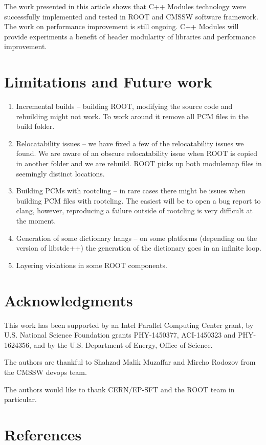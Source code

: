 \documentclass[12pt]{iopart}
\begin{document}
 The work presented in this article shows that C++ Modules technology were successfully implemented and tested in ROOT and CMSSW software framework. The work on performance improvement is still ongoing. C++ Modules will provide experiments a benefit of header modularity of libraries and performance improvement.

\section{Limitations and Future work}
\begin{enumerate}
    \item Incremental builds -- building ROOT, modifying the source code and rebuilding might not work. To work around it remove all PCM files in the build folder.
    \item Relocatability issues -- we have fixed a few of the relocatability issues we found. We are aware of an obscure relocatability issue when ROOT is copied in another folder and we are rebuild. ROOT picks up both modulemap files in seemingly distinct locations.
    \item Building PCMs with rootcling -- in rare cases there might be issues when building PCM files with rootcling. The easiest will be to open a bug report to clang, however, reproducing a failure outside of rootcling is very difficult at the moment.
    \item Generation of some dictionary hangs -- on some platforms (depending on the version of libstdc++) the generation of the dictionary goes in an infinite loop. 
    \item Layering violations in some ROOT components.
\end{enumerate}


\section{Acknowledgments}
\label{ack}

This work has been supported by an Intel Parallel Computing Center grant, by U.S. National Science Foundation grants PHY-1450377, ACI-1450323 and PHY-1624356, and by the U.S. Department of Energy, Office of Science.

The authors are thankful to Shahzad Malik Muzaffar and Mircho Rodozov from the CMSSW devops team.

The authors would like to thank CERN/EP-SFT and the ROOT team in particular.


\section*{References}
\end{document}
